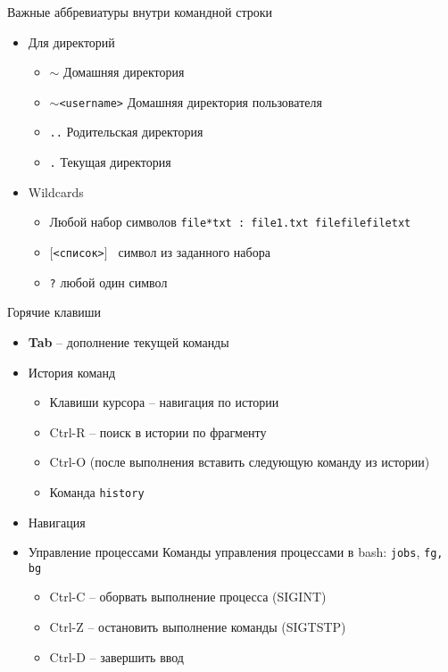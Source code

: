 \documentclass[ignorenonframetext, professionalfonts, hyperref={pdftex, unicode}]{beamer}
\begin{document}
\begin{frame}{Важные аббревиатуры внутри командной строки}
  \begin{itemize}
    \item Для директорий
    \begin{itemize}
      \item {\tt $\sim$} Домашняя директория
      \item {\tt $\sim$<username>} Домашняя директория пользователя
      \item {\tt ..} Родительская директория
      \item {\tt .} Текущая директория
    \end{itemize}
  \pause  
  \item Wildcards
    \begin{itemize}
      \item {\tt *} Любой набор символов {\tt file*txt : file1.txt filefilefiletxt}
      \item {\tt $[$<список>$]$ } символ из заданного набора {\tt }
      \item {\tt ?} любой один символ
     \end{itemize}

  \end{itemize}
\end{frame}       
\begin{frame}{Горячие клавиши}
  \begin{itemize}
    \item \textbf{Tab} -- дополнение текущей команды
     \pause
    \item История команд
      \begin{itemize}
        \item Клавиши курсора -- навигация по истории
        \item Ctrl-R -- поиск в истории по фрагменту
        \item Ctrl-O (после выполнения вставить следующую команду из истории)
        \item Команда {\tt history}
       \end{itemize}
    \item Навигация
	\item Управление процессами
		Команды управления процессами в bash: {\tt jobs}, {\tt fg, \tt bg}
	  \begin{itemize}
		\item Ctrl-C -- оборвать выполнение процесса (SIGINT)
		\item Ctrl-Z -- остановить выполнение команды (SIGTSTP)
		\item Ctrl-D -- завершить ввод
	  \end{itemize}
   \end{itemize}
\end{frame}
\end{document}
